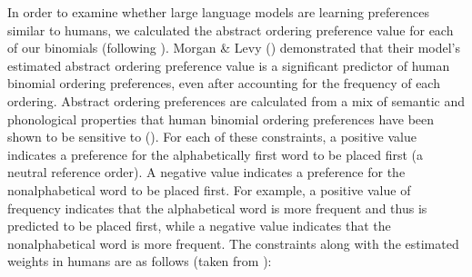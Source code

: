 \documentclass[
  12pt,
  letterpaper,
]{scrreprt}
\begin{document}
In order to examine whether large language models are learning
preferences similar to humans, we calculated the abstract ordering
preference value for each of our binomials (following
). Morgan \& Levy
() demonstrated
that their model's estimated abstract ordering preference value is a
significant predictor of human binomial ordering preferences, even after
accounting for the frequency of each ordering. Abstract ordering
preferences are calculated from a mix of semantic and phonological
properties that human binomial ordering preferences have been shown to
be sensitive to (). For each of these constraints, a positive value
indicates a preference for the alphabetically first word to be placed
first (a neutral reference order). A negative value indicates a
preference for the nonalphabetical word to be placed first. For example,
a positive value of frequency indicates that the alphabetical word is
more frequent and thus is predicted to be placed first, while a negative
value indicates that the nonalphabetical word is more frequent. The
constraints along with the estimated weights in humans are as follows
(taken from ):
\end{document}
